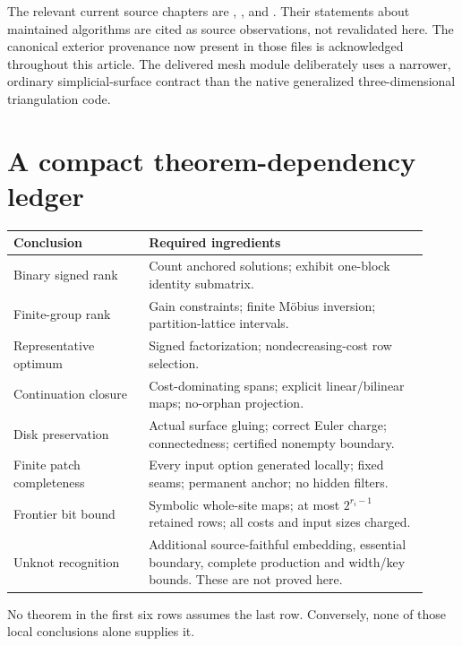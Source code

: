 \documentclass[11pt,letterpaper]{article}
\theoremstyle{definition}
\begin{document}
The relevant current source chapters are , , and . Their statements about maintained algorithms are cited as source observations, not revalidated here. The canonical exterior provenance now present in those files is acknowledged throughout this article. The delivered mesh module deliberately uses a narrower, ordinary simplicial-surface contract than the native generalized three-dimensional triangulation code.

\section{A compact theorem-dependency ledger}
\begin{center}\small
\begin{tabular}{p{0.30\linewidth}p{0.62\linewidth}}
\toprule
Conclusion & Required ingredients\\
\midrule
Binary signed rank & Count anchored solutions; exhibit one-block identity submatrix.\\
Finite-group rank & Gain constraints; finite M\"obius inversion; partition-lattice intervals.\\
Representative optimum & Signed factorization; nondecreasing-cost row selection.\\
Continuation closure & Cost-dominating spans; explicit linear/bilinear maps; no-orphan projection.\\
Disk preservation & Actual surface gluing; correct Euler charge; connectedness; certified nonempty boundary.\\
Finite patch completeness & Every input option generated locally; fixed seams; permanent anchor; no hidden filters.\\
Frontier bit bound & Symbolic whole-site maps; at most $2^{r_i-1}$ retained rows; all costs and input sizes charged.\\
Unknot recognition & Additional source-faithful embedding, essential boundary, complete production and width/key bounds. These are not proved here.\\
\bottomrule
\end{tabular}
\end{center}
No theorem in the first six rows assumes the last row. Conversely, none of those local conclusions alone supplies it.

\clearpage
{}

\end{document}
